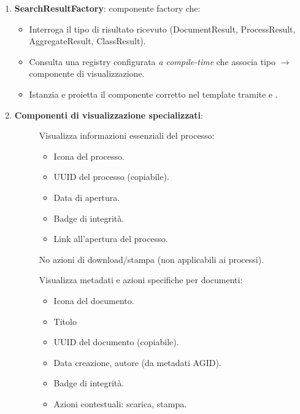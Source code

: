 \begin{enumerate}
    \item \textbf{SearchResultFactory}: componente factory che:
    \begin{itemize}
        \item Interroga il tipo di risultato ricevuto (DocumentResult, ProcessResult, AggregateResult, ClassResult).
        \item Consulta una registry configurata \textit{a compile-time} che associa tipo $\to$ componente di visualizzazione.
        \item Istanzia e proietta il componente corretto nel template tramite  e .
    \end{itemize}
    
    \item \textbf{Componenti di visualizzazione specializzati}:
    \begin{description}
        \item[] Visualizza informazioni essenziali del processo:
        \begin{itemize}
            \item Icona del processo.
            \item UUID del processo (copiabile).
            \item Data di apertura.
            \item Badge di integrità.
            \item Link all'apertura del processo.
        \end{itemize}
        No azioni di download/stampa (non applicabili ai processi).
        
        \item[] Visualizza metadati e azioni specifiche per documenti:
        \begin{itemize}
            \item Icona del documento.
            \item Titolo
            \item UUID del documento (copiabile).
            \item Data creazione, autore (da metadati AGID).
            \item Badge di integrità.
            \item Azioni contestuali: scarica, stampa.
        \end{itemize}
        

\end{description}
\end{enumerate}

